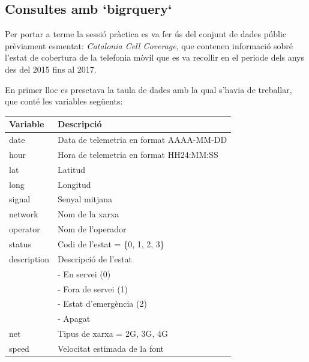 \documentclass[11pt,longbibliography]{article}
\theoremstyle{definition}
\theoremstyle{remark}
\begin{document}
\subsection{Consultes amb `bigrquery`}


Per portar a terme la sessió pràctica es va fer ús del conjunt de dades públic prèviament esmentat: \emph{Catalonia Cell Coverage}, que contenen informació sobré l'estat de cobertura de la telefonia mòvil que es va recollir en el periode dels anys des del 2015 fins al 2017.


En primer lloc es presetava la taula de dades amb la qual s'havia de treballar, que conté les variables següents:


\begin{longtable}[H]{p{} | p{} } 
\textbf{Variable} & \textbf{Descripció}                              \\ \hline
date              & Data de telemetria en format AAAA-MM-DD          \\
hour              & Hora de telemetria en format HH24:MM:SS          \\
lat               & Latitud                                          \\
long              & Longitud                                         \\
signal            & Senyal mitjana                                   \\
network           & Nom de la xarxa                                  \\
operator          & Nom de l'operador                                \\
status            & Codi de l'estat = \{0, 1, 2, 3\}                 \\
description       & Descripció de l'estat                            \\
                  & - En servei (0)                                  \\
                  & - Fora de servei (1)                             \\
                  & - Estat d'emergència (2)                         \\
                  & - Apagat                                         \\
net               & Tipus de xarxa = 2G, 3G, 4G                      \\
speed             & Velocitat estimada de la font                    \\

\end{longtable}
\end{document}
